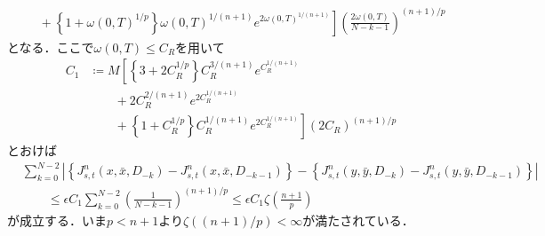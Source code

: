 \begin{prf}
\begin{description}
\begin{align}
						&\quad + \left. \left\{ 1 + \omega(0,T)^{1/p} \right\} \omega(0,T)^{1/(n+1)} e^{2 \omega(0,T)^{1/(n+1)}} \right] \left( \frac{2\omega(0,T)}{N-k-1} \right)^{(n+1)/p}
				\end{align}
				となる．ここで$\omega(0,T) \leq C_R$を用いて
				\begin{align}
					C_1 &\coloneqq M \left[ 
						\left\{ 3 + 2 C_R^{1/p} \right\} C_R^{3/(n+1)} e^{C_R^{1/(n+1)}} \right.\\
						&\qquad + 2C_R^{2/(n+1)} e^{2 C_R^{1/(n+1)}} \\
						&\qquad + \left. \left\{ 1 + C_R^{1/p} \right\} C_R^{1/(n+1)} e^{2 C_R^{1/(n+1)}} \right] \left( 2C_R \right)^{(n+1)/p}
				\end{align}
				とおけば
				\begin{align}
					&\sum_{k=0}^{N-2} \left| \left\{J^n_{s,t}(x,\bar{x},D_{-k}) - J^n_{s,t}(x,\bar{x},D_{-k-1})\right\} - \left\{J^n_{s,t}(y,\bar{y},D_{-k}) - J^n_{s,t}(y,\bar{y},D_{-k-1})\right\} \right| \\
					&\qquad \leq \epsilon C_1 \sum_{k=0}^{N-2} \left( \frac{1}{N-k-1} \right)^{(n+1)/p}
					\leq \epsilon C_1 \zeta\left( \frac{n+1}{p} \right)
				\end{align}
				が成立する．いま$p < n+1$より$\zeta((n+1)/p) < \infty$が満たされている．
				

\end{description}
\end{prf}
